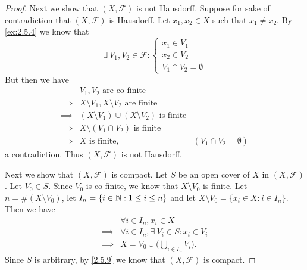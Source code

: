 \begin{proof}
  Next we show that \((X, \mathcal{F})\) is not Hausdorff.
  Suppose for sake of contradiction that \((X, \mathcal{F})\) is Hausdorff.
  Let \(x_1, x_2 \in X\) such that \(x_1 \neq x_2\).
  By \cref{ex:2.5.4} we know that
  \[
    \exists\ V_1, V_2 \in \mathcal{F} : \begin{cases}
      x_1 \in V_1 \\
      x_2 \in V_2 \\
      V_1 \cap V_2 = \emptyset
    \end{cases}
  \]
  But then we have
  \begin{align*}
             & V_1, V_2 \text{ are co-finite}                                                          \\
    \implies & X \setminus V_1, X \setminus V_2 \text{ are finite}                                     \\
    \implies & (X \setminus V_1) \cup (X \setminus V_2) \text{ is finite}                              \\
    \implies & X \setminus (V_1 \cap V_2) \text{ is finite}                                            \\
    \implies & X \text{ is finite},                                       & (V_1 \cap V_2 = \emptyset)
  \end{align*}
  a contradiction.
  Thus \((X, \mathcal{F})\) is not Hausdorff.

  Next we show that \((X, \mathcal{F})\) is compact.
  Let \(S\) be an open cover of \(X\) in \((X, \mathcal{F})\).
  Let \(V_0 \in S\).
  Since \(V_0\) is co-finite, we know that \(X \setminus V_0\) is finite.
  Let \(n = \#(X \setminus V_0)\), let \(I_n = \{i \in \mathbb{N} : 1 \leq i \leq n\}\) and let \(X \setminus V_0 = \{x_i \in X : i \in I_n\}\).
  Then we have
  \begin{align*}
             & \forall i \in I_n, x_i \in X                        \\
    \implies & \forall i \in I_n, \exists\ V_i \in S : x_i \in V_i \\
    \implies & X = V_0 \cup \bigg(\bigcup_{i \in I_n} V_i\bigg).
  \end{align*}
  Since \(S\) is arbitrary, by \cref{2.5.9} we know that \((X, \mathcal{F})\) is compact.


\end{proof}
